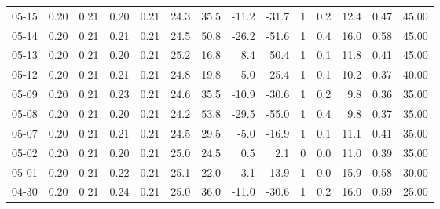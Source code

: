 \begin{threeparttable}
{\begin{tabular}{lrrrrrrrrrrrrr}
  05-15 &          0.20 &          0.21 &          0.20 &        0.21 &                24.3 &                35.5 &      -11.2 &        -31.7 &              1 &                 0.2 &             12.4 &            0.47 &                  45.00 \\
  05-14 &          0.20 &          0.21 &          0.21 &        0.21 &                24.5 &                50.8 &      -26.2 &        -51.6 &              1 &                 0.4 &             16.0 &            0.58 &                  45.00 \\
  05-13 &          0.20 &          0.21 &          0.20 &        0.21 &                25.2 &                16.8 &        8.4 &         50.4 &              1 &                 0.1 &             11.8 &            0.41 &                  45.00 \\
  05-12 &          0.20 &          0.21 &          0.21 &        0.21 &                24.8 &                19.8 &        5.0 &         25.4 &              1 &                 0.1 &             10.2 &            0.37 &                  40.00 \\
  05-09 &          0.20 &          0.21 &          0.23 &        0.21 &                24.6 &                35.5 &      -10.9 &        -30.6 &              1 &                 0.2 &              9.8 &            0.36 &                  35.00 \\
  05-08 &          0.20 &          0.21 &          0.20 &        0.21 &                24.2 &                53.8 &      -29.5 &        -55.0 &              1 &                 0.4 &              9.8 &            0.37 &                  35.00 \\
  05-07 &          0.20 &          0.21 &          0.21 &        0.21 &                24.5 &                29.5 &       -5.0 &        -16.9 &              1 &                 0.1 &             11.1 &            0.41 &                  35.00 \\
  05-02 &          0.20 &          0.21 &          0.20 &        0.21 &                25.0 &                24.5 &        0.5 &          2.1 &              0 &                 0.0 &             11.0 &            0.39 &                  35.00 \\
  05-01 &          0.20 &          0.21 &          0.22 &        0.21 &                25.1 &                22.0 &        3.1 &         13.9 &              1 &                 0.0 &             15.9 &            0.58 &                  30.00 \\
  04-30 &          0.20 &          0.21 &          0.24 &        0.21 &                25.0 &                36.0 &      -11.0 &        -30.6 &              1 &                 0.2 &             16.0 &            0.59 &                  25.00 \\

\end{tabular}}
\end{threeparttable}
